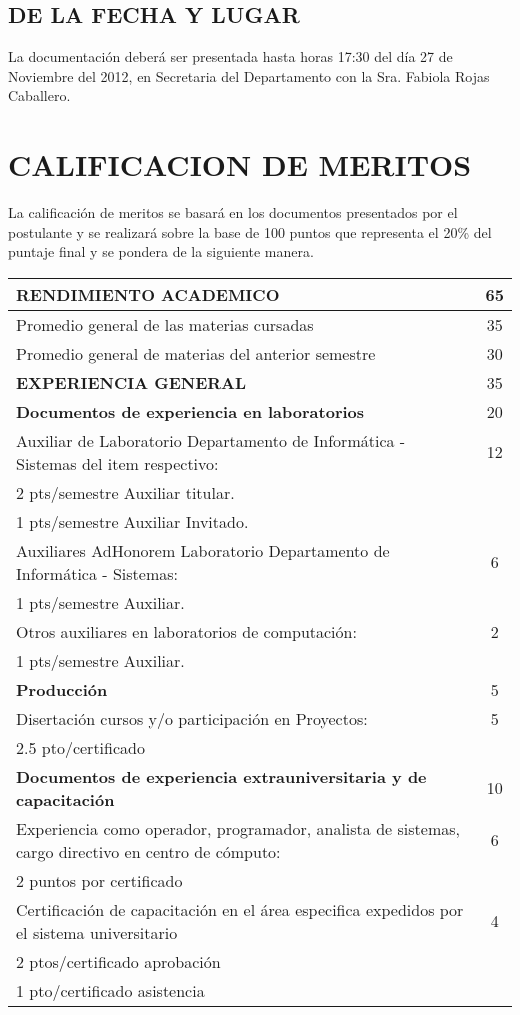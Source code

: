 \documentclass[letterpaper,11pt]{article}
\begin{document}
\subsection{DE LA FECHA Y LUGAR}
La documentación deberá ser presentada hasta horas 17:30 del día 27 de Noviembre del 2012, en Secretaria del Departamento con la Sra. Fabiola Rojas Caballero.

\section{CALIFICACION DE MERITOS}
La calificación de meritos se basará en los documentos presentados por el postulante y se realizará sobre la base de 100 puntos que representa el 20\% del puntaje final y se pondera de la siguiente manera.

\begin{tabular}{|p{14cm}|c|}
\hline
 \textbf{RENDIMIENTO ACADEMICO} & 65 \\
\hline
 Promedio general de las materias cursadas & 35 \\
\hline
 Promedio general de materias del anterior semestre & 30 \\
\hline
 \textbf{EXPERIENCIA GENERAL} & 35 \\
\hline
 \textbf{Documentos de experiencia en laboratorios} & 20 \\
\hline
 Auxiliar de Laboratorio Departamento de Informática - Sistemas del item respectivo: & 12 \\
\hline
 2 pts/semestre Auxiliar titular. &  \\
\hline
 1 pts/semestre Auxiliar Invitado. &  \\
\hline
 Auxiliares AdHonorem Laboratorio Departamento de Informática - Sistemas: & 6 \\
\hline
 1 pts/semestre Auxiliar. &  \\
\hline
 Otros auxiliares en laboratorios de computación: & 2 \\
\hline
 1 pts/semestre Auxiliar. &  \\
\hline
 \textbf{Producción} & 5 \\
\hline
 Disertación cursos y/o participación en Proyectos: & 5 \\
\hline
 2.5 pto/certificado &  \\
\hline
 \textbf{Documentos de experiencia extrauniversitaria y de capacitación} & 10 \\
\hline
 Experiencia como operador, programador, analista de sistemas, cargo directivo en centro de cómputo: & 6 \\
\hline
 2 puntos por certificado &  \\
\hline
 Certificación de capacitación en el área especifica expedidos por el sistema universitario & 4 \\
\hline
 2 ptos/certificado aprobación &  \\
\hline
 1 pto/certificado asistencia &  \\
\hline
\end{tabular}
\end{document}
